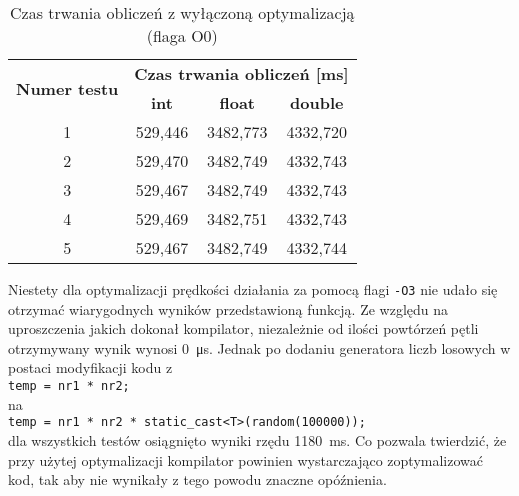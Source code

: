         \begin{table}[ht]
    		\centering
    		\begin{tabular}{|c|c|c|c|}
                \hline
                \multirow{ 2}{*}{\textbf{Numer testu}} & \multicolumn{3}{c|}{\textbf{Czas trwania obliczeń [\si{\milli\second}]}}     \\ \cline{2-4} 
                & \textbf{int} & \textbf{float}   & \textbf{double}      \\ \hline \hline
                1           & 529,446    & 3482,773 & 4332,720     \\ \hline
                2           & 529,470    & 3482,749 & 4332,743     \\ \hline
                3           & 529,467    & 3482,749 & 4332,743     \\ \hline
                4           & 529,469    & 3482,751 & 4332,743     \\ \hline
                5           & 529,467    & 3482,749 & 4332,744     \\ \hline
                \end{tabular}
    		\caption{Czas trwania obliczeń z wyłączoną optymalizacją (flaga O0)}
    		\label{tab:czasTrwaniaObliczeńO0}
    	\end{table}
        Niestety dla optymalizacji prędkości działania za pomocą flagi \texttt{-O3} nie udało się otrzymać wiarygodnych wyników przedstawioną funkcją. Ze względu na uproszczenia jakich dokonał kompilator, niezależnie od ilości powtórzeń pętli otrzymywany wynik wynosi \SI{0}{\micro\second}. Jednak po dodaniu generatora liczb losowych w postaci modyfikacji kodu z \\ 
        \verb+temp = nr1 * nr2;+ \\ 
        na \\
        \verb+temp = nr1 * nr2 * static_cast<T>(random(100000));+ \\ 
        dla wszystkich testów osiągnięto wyniki rzędu \SI{1180}{\milli\second}. Co pozwala twierdzić, że przy użytej optymalizacji kompilator powinien wystarczająco zoptymalizować kod, tak aby nie wynikały z tego powodu znaczne opóźnienia.
        
